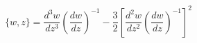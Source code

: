 \begin{equation}
\{w,z\}= \frac{d^{3}w}{dz^{3}} (\frac{dw}{dz})^{-1} - \frac{3}{2}[\frac{d^{2}w}{dz^{2}}
(\frac{dw}{dz})^{-1}]^{2}
\end{equation}

